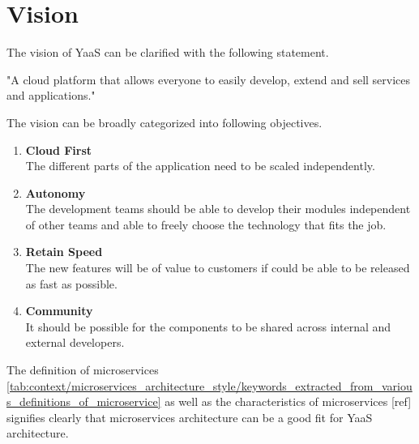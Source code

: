 \section{Vision}\label{section:hybris_architecture/vision}
The vision of \acrshort{YaaS} can be clarified with the following statement.
\begin{shaded}
"A cloud platform that allows everyone to easily develop, extend and sell services and applications." \\
\cite{Stubbe:2015aa}
\end{shaded}
The vision can be broadly categorized into following objectives.\\
\begin{enumerate}
\item \textbf{Cloud First}\\
The different parts of the application need to be scaled independently.
\item \textbf{Autonomy}\\
The development teams should be able to develop their modules independent of other teams and able to freely choose the technology that fits the job.
\item \textbf{Retain Speed}\\
The new features will be of value to customers if could be able to be released as fast as possible.
\item \textbf{Community}\\
It should be possible for the components to be shared across internal and external developers.
\end{enumerate}
The definition of microservices \ref{tab:context/microservices_architecture_style/keywords_extracted_from_various_definitions_of_microservice} as well as the characteristics of microservices [ref] signifies clearly that microservices architecture can be a good fit for \acrshort{YaaS} architecture.
